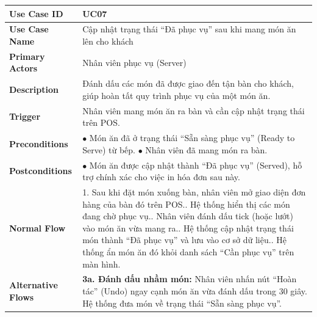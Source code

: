 \begin{longtable}{|p{3.5cm}|p{12.5cm}|}
\hline
\textbf{Use Case ID} & UC07 \\ \hline
\textbf{Use Case Name} & Cập nhật trạng thái ``Đã phục vụ'' sau khi mang món ăn lên cho khách \\ \hline
\textbf{Primary Actors} & Nhân viên phục vụ (Server) \\ \hline
\textbf{Description} & Đánh dấu các món đã được giao đến tận bàn cho khách, giúp hoàn tất quy trình phục vụ của một món ăn. \\ \hline
\textbf{Trigger} & Nhân viên mang món ăn ra bàn và cần cập nhật trạng thái trên POS. \\ \hline
\textbf{Preconditions} &
$\bullet$ Món ăn đã ở trạng thái ``Sẵn sàng phục vụ'' (Ready to Serve) từ bếp.\newline
$\bullet$ Nhân viên đã mang món ra bàn. \\ \hline
\textbf{Postconditions} & $\bullet$ Món ăn được cập nhật thành ``Đã phục vụ'' (Served), hỗ trợ chính xác cho việc in hóa đơn sau này. \\ \hline
\textbf{Normal Flow} &
1. Sau khi đặt món xuống bàn, nhân viên mở giao diện đơn hàng của bàn đó trên POS.\newline
2. Hệ thống hiển thị các món đang chờ phục vụ.\newline
3. Nhân viên đánh dấu tick (hoặc lướt) vào món ăn vừa mang ra.\newline
4. Hệ thống cập nhật trạng thái món thành ``Đã phục vụ'' và lưu vào cơ sở dữ liệu.\newline
5. Hệ thống ẩn món ăn đó khỏi danh sách ``Cần phục vụ'' trên màn hình. \\ \hline
\textbf{Alternative Flows} &
\textbf{3a. Đánh dấu nhầm món:} Nhân viên nhấn nút ``Hoàn tác'' (Undo) ngay cạnh món ăn vừa đánh dấu trong 30 giây. Hệ thống đưa món về trạng thái ``Sẵn sàng phục vụ''. \\ \hline
\end{longtable}

